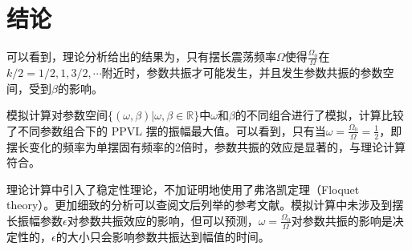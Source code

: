 \section{结论}

可以看到，理论分析给出的结果为，只有摆长震荡频率$\Omega$使得$\frac{\Omega_{0}}{\Omega}$在$k/2=1/2,1,3/2,\cdots$附近时，参数共振才可能发生，并且发生参数共振的参数空间，受到$\beta$的影响。

模拟计算对参数空间$\{(\omega,\beta)|\omega,\beta\in\mathbb{R}\}$中$\omega$和$\beta$的不同组合进行了模拟，计算比较了不同参数组合下的 PPVL 摆的振幅最大值。可以看到，只有当$\omega=\frac{\Omega_{0}}{\Omega}=\frac{1}{2}$，即摆长变化的频率为单摆固有频率的2倍时，参数共振的效应是显著的，与理论计算符合。

理论计算中引入了稳定性理论，不加证明地使用了弗洛凯定理（Floquet theory）。更加细致的分析可以查阅文后列举的参考文献。模拟计算中未涉及到摆长振幅参数$\epsilon$对参数共振效应的影响，但可以预测，$\omega=\frac{\Omega_{0}}{\Omega}$对参数共振的影响是决定性的，$\epsilon$的大小只会影响参数共振达到幅值的时间。